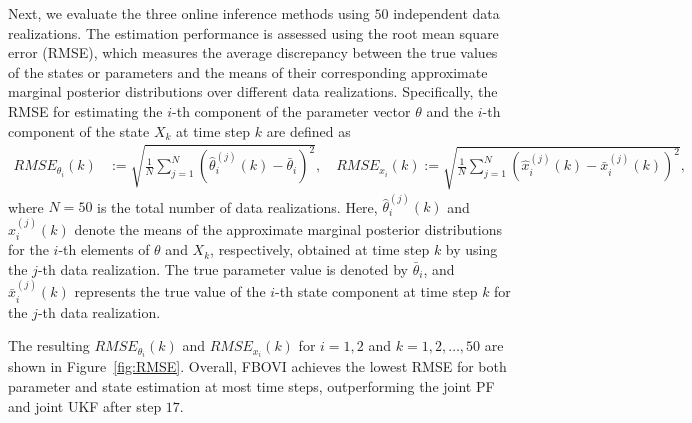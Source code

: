 \documentclass[preprint,3p,times]{elsarticle}
\begin{document}
Next, we evaluate the three online inference methods using $50$ independent data realizations. The estimation performance is assessed using the root mean square error (RMSE), which measures the average discrepancy between the true values of the states or parameters and the means of their corresponding approximate marginal posterior distributions over different data realizations. Specifically, the RMSE for estimating the $i$-th component of the parameter vector $\theta$ and the $i$-th component of the state $X_k$ at time step $k$ are defined as 
\begin{align}
RMSE_{\theta_i}(k) &:= \sqrt{\frac{1}{N}\sum_{j=1}^N\left(\hat{\theta}_{i}^{(j)}(k)-\bar{\theta}_i\right)^2}, 
\quad RMSE_{x_i}(k)  := \sqrt{\frac{1}{N}\sum_{j=1}^N\left(\hat{x}_{i}^{(j)}(k)-\bar{x}_{i}^{(j)}(k)\right)^2}, \label{eq:rmse_state}
\end{align}
where $N=50$ is the total number of data realizations. Here, $\hat{\theta}_{i}^{(j)}(k)$ and $\hat{x}_{i}^{(j)}(k)$ denote the means of the approximate marginal posterior distributions for the $i$-th elements of $\theta$ and $X_k$, respectively, obtained at time step $k$ by using the $j$-th data realization. The true parameter value is denoted by $\bar{\theta}_i$, and $\bar{x}_{i}^{(j)}(k)$ represents the true value of the $i$-th state component at time step $k$ for the $j$-th data realization.

The resulting $RMSE_{\theta_i}(k)$ and $RMSE_{x_i}(k)$ for $i=1,2$ and $k=1,2,\ldots,50$ are shown in Figure~\ref{fig:RMSE}.
Overall, FBOVI achieves the lowest RMSE for both parameter and state estimation at most time steps, outperforming the joint PF and joint UKF after step $17$.
\end{document}
